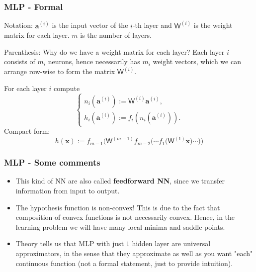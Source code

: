 \documentclass{beamer}
\begin{document}
	\begin{frame}
		\frametitle{MLP - Formal}
		Notation: $\bm{a}^{(i)}$ is the input vector of the $i$-th layer and $\mathsf{W}^{(i)}$ is the weight matrix for each layer. $m$ is the number of layers.
		
		\vspace{5mm}
		
		Parenthesis: Why do we have a weight matrix for each layer? Each layer $i$ consists of $m_i$ neurons, hence necessarily has $m_i$ weight vectors, which we can arrange row-wise to form the matrix $\mathsf{W}^{(i)}$.
		
		\vspace{5mm} 
		
		For each layer $i$ compute
		\begin{equation*}
			\begin{cases}
				n_i(\bm{a}^{(i)}) := \mathsf{W}^{(i)} \bm{a}^{(i)},\\
				h_i(\bm{a}^{(i)}) := f_i(n_i(\bm{a}^{(i)})).
			\end{cases}
		\end{equation*}
	Compact form:
	\begin{equation*}
		h(\bm{x}) := f_{m-1}\big(\mathsf{W}^{(m-1)}f_{m-2}\big(\cdots f_1 \big(\mathsf{W}^{(1)} \bm{x}\big) \cdots\big)\big)
	\end{equation*}
	\end{frame}

	\begin{frame}
		\frametitle{MLP - Some comments}
		\begin{itemize}
			\setlength\itemsep{5mm}
			\item This kind of NN are also called \textbf{feedforward NN}, since we transfer information from input to output.
			\item The hypothesis function is non-convex! This is due to the fact that composition of convex functions is not necessarily convex. Hence, in the learning problem we will have many local minima and saddle points.
			\item Theory tells us that MLP with just $1$ hidden layer are universal approximators, in the sense that they approximate as well as you want "each" continuous function (not a formal statement, just to provide intuition).
		\end{itemize}
	\end{frame}
\end{document}
